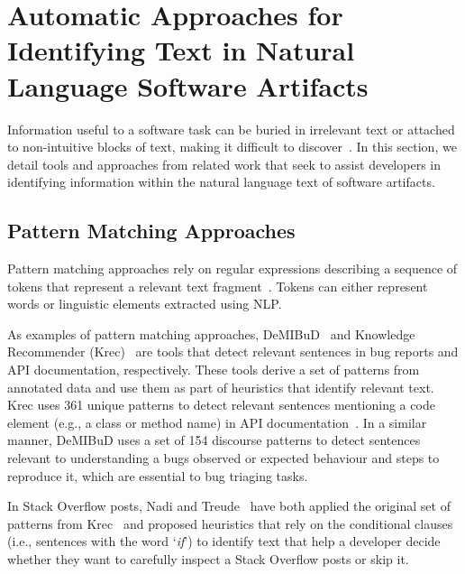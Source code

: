 \section{Automatic Approaches for Identifying Text in Natural Language Software Artifacts}
\label{cp2:text-approaches}



Information useful to a software task can be buried in irrelevant text or attached to 
non-intuitive blocks of text, making it difficult to discover~\cite{Robillard2015}.
In this section, we detail tools and approaches from related work
that seek to assist developers in 
identifying information within the natural language
text of software artifacts.





\subsection{Pattern Matching Approaches}
\label{cp2:pattern-matching}


Pattern matching approaches rely on regular expressions describing a sequence of tokens that represent
 a relevant text fragment~\cite{Bavota2016}. Tokens can either represent words or linguistic elements 
extracted using \acf{NLP}.
    
    
As examples  of pattern matching approaches,  {\small DeMIBuD}~\cite{Chaparro2017}
 and Knowledge Recommender (Krec)~\cite{Maalej2013, Robillard2015} are tools that detect relevant sentences in bug reports and API documentation, respectively. 
These tools derive a set of patterns from annotated data and use them as part of heuristics 
that identify relevant text. Krec  uses  361 unique patterns
to 
detect relevant sentences mentioning a 
code element (e.g., a class or method name) in API documentation~\cite{Robillard2015}.
In a similar manner, {\small DeMIBuD} uses a set of 154 discourse patterns to detect sentences 
relevant to understanding a bugs observed or expected behaviour and steps to reproduce it,
which are essential to bug triaging tasks.




In Stack Overflow posts,
Nadi and Treude~\cite{nadi2020} have both applied the original set of patterns from Krec~\cite{Robillard2015} 
and proposed heuristics that rely on the conditional clauses (i.e., sentences with the word `\textit{if}')
to identify text that help a developer 
decide whether they want to carefully inspect a Stack Overflow posts or skip it. 



